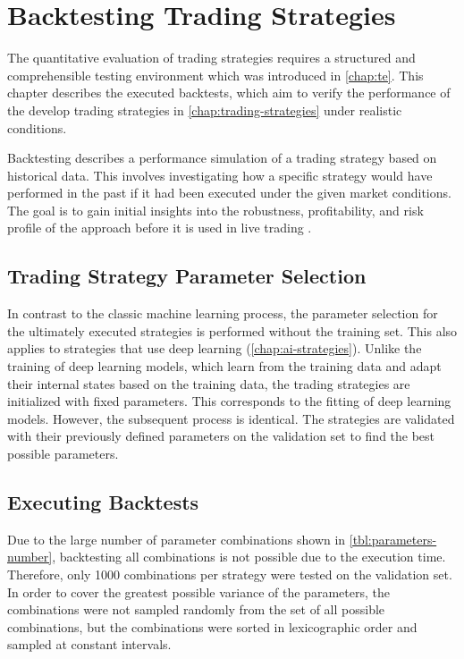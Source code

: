 \section{Backtesting Trading Strategies}
\label{chap:backtesting}

The quantitative evaluation of trading strategies requires a structured and comprehensible testing environment which was introduced in \autoref{chap:te}.
This chapter describes the executed backtests, which aim to verify the performance of the develop trading strategies in \autoref{chap:trading-strategies} under realistic conditions.

Backtesting describes a performance simulation of a trading strategy based on historical data.
This involves investigating how a specific strategy would have performed in the past if it had been executed under the given market conditions.
The goal is to gain initial insights into the robustness, profitability, and risk profile of the approach before it is used in live trading \cite{backtesting}.

\subsection{Trading Strategy Parameter Selection}

In contrast to the classic machine learning process, the parameter selection for the ultimately executed strategies is performed without the training set.
This also applies to strategies that use deep learning (\autoref{chap:ai-strategies}).
Unlike the training of deep learning models, which learn from the training data and adapt their internal states based on the training data, the trading strategies are initialized with fixed parameters.
This corresponds to the fitting of deep learning models.
However, the subsequent process is identical.
The strategies are validated with their previously defined parameters on the validation set to find the best possible parameters.

\subsection{Executing Backtests}

Due to the large number of parameter combinations shown in \autoref{tbl:parameters-number}, backtesting all combinations is not possible due to the execution time.
Therefore, only 1000 combinations per strategy were tested on the validation set.
In order to cover the greatest possible variance of the parameters, the combinations were not sampled randomly from the set of all possible combinations, but the combinations were sorted in lexicographic order and sampled at constant intervals.

